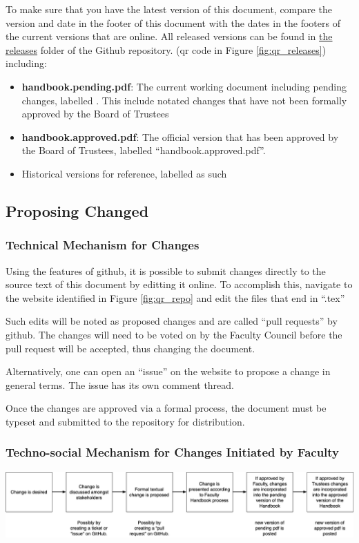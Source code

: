 		To make sure that you have the latest version of this document, compare the version and date in the
		footer of this document with the dates in the footers of the current versions that are online.
		All released versions can be found in
		\href{https://github.com/djp3/WestmontFacultyHandbook/tree/main/releases}{the releases} folder of the Github repository.
		(qr code in Figure \ref{fig:qr_releases}) including:
		\begin{itemize}
			\item{{\bfseries handbook.pending.pdf}:
				The current working document including pending changes, labelled
				. This include notated changes that have not been formally approved by the Board of Trustees}
			\item{{\bfseries handbook.approved.pdf}:
				The official version that has been approved by the Board of Trustees, labelled ``handbook.approved.pdf''.}
			\item{Historical versions for reference, labelled as such}
		\end{itemize}

	\subsection{Proposing Changed}
		\subsubsection{Technical Mechanism for Changes}
			Using the features of github, it is possible to submit changes
			directly to the source text of this document by editting
			it online. To accomplish this,
			navigate to the website identified in Figure \ref{fig:qr_repo} and
			edit the files that end in ``.tex''

			Such edits will be noted as proposed changes and are called ``pull requests'' by github.
			The changes will need to be voted on by the Faculty Council before the pull request will be accepted, thus changing the document.

			Alternatively, one can open an ``issue'' on the website to propose a change in general terms.  The issue has its own
			comment thread.

			Once the changes are approved via a formal process, the document must be typeset and submitted to the repository for distribution.
		\subsubsection{Techno-social Mechanism for Changes Initiated by Faculty}
			\begin{center}
				\includegraphics[width=\textwidth]{images/change_process.png}
			\end{center}





